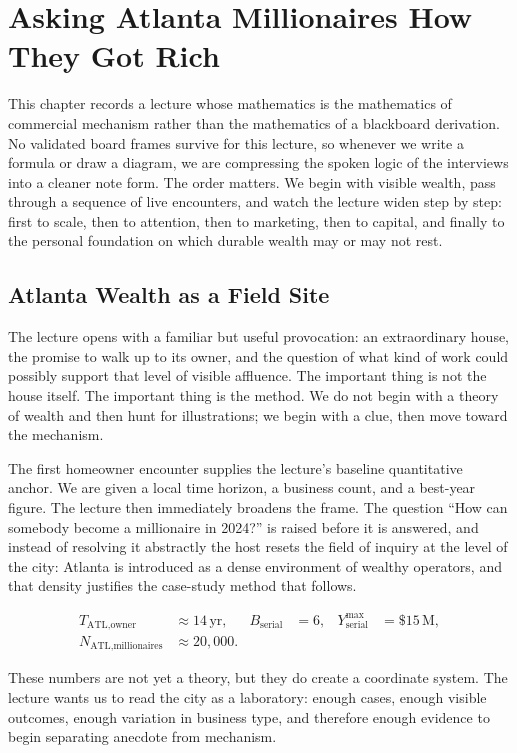 \chapter{Asking Atlanta Millionaires How They Got Rich}

This chapter records a lecture whose mathematics is the mathematics of commercial mechanism rather than the mathematics of a blackboard derivation. No validated board frames survive for this lecture, so whenever we write a formula or draw a diagram, we are compressing the spoken logic of the interviews into a cleaner note form. The order matters. We begin with visible wealth, pass through a sequence of live encounters, and watch the lecture widen step by step: first to scale, then to attention, then to marketing, then to capital, and finally to the personal foundation on which durable wealth may or may not rest.

\section{Atlanta Wealth as a Field Site}

The lecture opens with a familiar but useful provocation: an extraordinary house, the promise to walk up to its owner, and the question of what kind of work could possibly support that level of visible affluence. The important thing is not the house itself. The important thing is the method. We do not begin with a theory of wealth and then hunt for illustrations; we begin with a clue, then move toward the mechanism.

The first homeowner encounter supplies the lecture's baseline quantitative anchor. We are given a local time horizon, a business count, and a best-year figure. The lecture then immediately broadens the frame. The question ``How can somebody become a millionaire in 2024?'' is raised before it is answered, and instead of resolving it abstractly the host resets the field of inquiry at the level of the city: Atlanta is introduced as a dense environment of wealthy operators, and that density justifies the case-study method that follows.

\begin{align}
T_{\text{ATL,owner}} &\approx 14\,\text{yr}, &
B_{\text{serial}} &= 6, &
Y^{\max}_{\text{serial}} &= \$15\,\mathrm{M},\\
N_{\text{ATL,millionaires}} &\approx 20{,}000. &&
\end{align}

These numbers are not yet a theory, but they do create a coordinate system. The lecture wants us to read the city as a laboratory: enough cases, enough visible outcomes, enough variation in business type, and therefore enough evidence to begin separating anecdote from mechanism.

